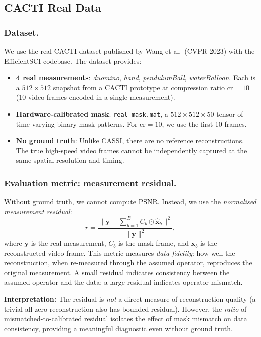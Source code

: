 \documentclass[runningheads]{llncs}
\begin{document}
\subsection{CACTI Real Data}

\subsubsection{Dataset.}
We use the real CACTI dataset published by Wang et al.\ (CVPR 2023) with the EfficientSCI codebase.
The dataset provides:
\begin{itemize}
    \item \textbf{4 real measurements}: \textit{duomino}, \textit{hand}, \textit{pendulumBall}, \textit{waterBalloon}. Each is a $512 \times 512$ snapshot from a CACTI prototype at compression ratio $\text{cr}{=}10$ (10 video frames encoded in a single measurement).
    \item \textbf{Hardware-calibrated mask}: \texttt{real\_mask.mat}, a $512 \times 512 \times 50$ tensor of time-varying binary mask patterns. For $\text{cr}{=}10$, we use the first 10 frames.
    \item \textbf{No ground truth}: Unlike CASSI, there are no reference reconstructions. The true high-speed video frames cannot be independently captured at the same spatial resolution and timing.
\end{itemize}

\subsubsection{Evaluation metric: measurement residual.}
Without ground truth, we cannot compute PSNR.
Instead, we use the \emph{normalised measurement residual}:
\begin{equation}
    r = \frac{\|\mathbf{y} - \sum_{b=1}^{B} C_b \odot \hat{\mathbf{x}}_b\|^2}{\|\mathbf{y}\|^2},
\end{equation}
where $\mathbf{y}$ is the real measurement, $C_b$ is the mask frame, and $\hat{\mathbf{x}}_b$ is the reconstructed video frame.
This metric measures \emph{data fidelity}: how well the reconstruction, when re-measured through the assumed operator, reproduces the original measurement.
A small residual indicates consistency between the assumed operator and the data; a large residual indicates operator mismatch.

\textbf{Interpretation:} The residual is \emph{not} a direct measure of reconstruction quality (a trivial all-zero reconstruction also has bounded residual).
However, the \emph{ratio} of mismatched-to-calibrated residual isolates the effect of mask mismatch on data consistency, providing a meaningful diagnostic even without ground truth.
\end{document}
